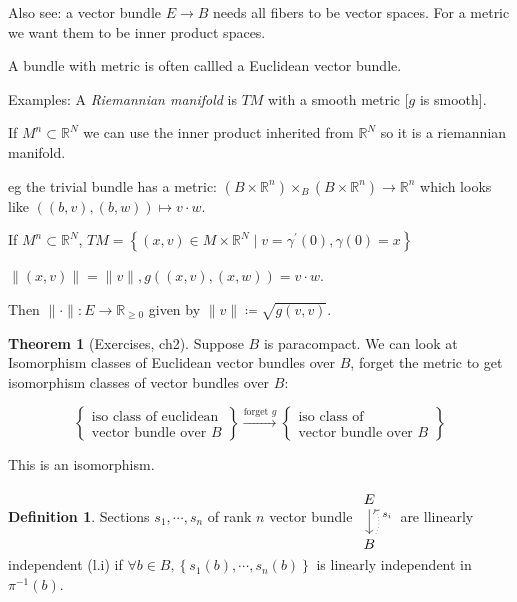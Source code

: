 \documentclass{article}
\theoremstyle{definition}
\newtheorem*{definition}{Definition}
\newtheorem{theorem}{Theorem}
\begin{document}
    Also see: a vector bundle \(E \to B\) needs all fibers to be vector spaces. For a metric we want them to be inner product spaces.

    A bundle with metric is often callled a Euclidean vector bundle.

    Examples: A \textit{Riemannian manifold} is \(TM\) with a smooth metric [\(g\) is smooth].

    If \(M^n \subset \mathbb{R}^N\) we can use the inner product inherited from \(\mathbb{R}^N\) so it is a riemannian manifold.

    eg the trivial bundle has a metric: \((B \times \mathbb{R}^n) \times_B (B \times \mathbb{R}^n) \to \mathbb{R}^n\) which looks like \(((b,v),(b,w)) \mapsto v \cdot w\). 

    If \(M^n \subset \mathbb{R}^N\), \(TM = \left\{ (x,v) \in M \times \mathbb{R}^N \mid v = \gamma^{\prime} (0), \gamma(0) = x \right\} \) 

    \(\lVert (x,v) \rVert = \lVert v \rVert, g((x,v),(x,w)) = v \cdot w\).

    Then \(\lVert \cdot \rVert : E \to \mathbb{R}_{\geq 0}\) given by \(\lVert v \rVert \coloneqq \sqrt{g(v,v)}\).

    \begin{theorem}
        [Exercises, ch2] Suppose \(B\) is paracompact. We can look at Isomorphism classes of Euclidean vector bundles over \(B\), forget the metric to get isomorphism classes of vector bundles over \(B\):

        \[
            \begin{Bmatrix}
                \text{iso class of euclidean} \\
                \text{vector bundle over \(B\)} 
            \end{Bmatrix} \xrightarrow{\text{forget } g}\begin{Bmatrix}
                \text{iso class of} \\
                \text{vector bundle over \(B\)} 
            \end{Bmatrix} 
        \]

        This is an isomorphism.
    \end{theorem}

    \begin{definition}
        Sections \(s_1, \cdots , s_n\) of rank \(n\) vector bundle \(\begin{tikzcd}
            E \ar[d] \\ B \ar[u, bend right, dotted, "s_i", swap]
        \end{tikzcd}\) are llinearly independent (l.i) if \(\forall b\in B, \left\{ s_1(b), \cdots , s_n(b) \right\} \) is linearly independent in \(\pi ^{-1} (b)\).  
    \end{definition}
\end{document}
